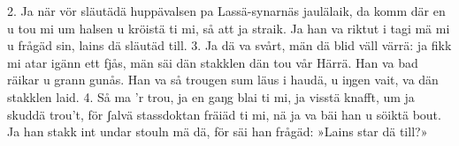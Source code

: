 2.  Ja när vör släutädä huppävalsen
    pa Lassä-synarnäs jaulälaik,
    da komm där en u tou mi um halsen
    u kröistä ti mi, så att ja straik.
    Ja han va riktut i tagi mä mi
    u frågäd sin, lains dä släutäd till.
3.  Ja dä va svårt, män dä blid väll värrä:
    ja fikk mi atar igänn ett fjås,
    män säi dän stakklen dän tou vår Härrä.
    Han va bad räikar u grann gunås.
    Han va så trougen sum läus i haudä,
    u iŋgen vait, va dän stakklen laid.
4.  Så ma ’r trou, ja en gaŋg blai ti mi,
    ja visstä knafft, um ja skuddä trou’t,
    för ʃalvä stassdoktan fräiäd ti mi,
    nä ja va bäi han u söiktä bout.
    Ja han stakk int undar stouln mä dä,
    för säi han frågäd: »Lains star dä till?»
